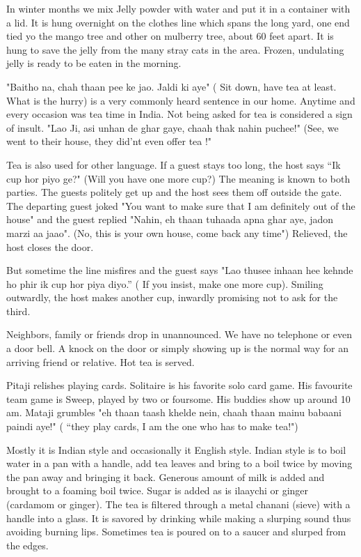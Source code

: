 In winter months we mix Jelly powder with water and put it in a container
with a lid. It is hung overnight on the clothes line which spans the long
yard, one end tied yo the mango tree and other on mulberry tree, about 60
feet apart. It is hung to save the jelly from the many stray cats in the
area. Frozen, undulating jelly is ready to be eaten in the morning. 

"Baitho na, chah thaan pee ke jao. Jaldi ki aye" ( Sit down, have tea at
least. What is the hurry) is a very commonly heard sentence in our home.
Anytime and every occasion was tea time in India. Not being asked for tea
is considered a sign of insult. "Lao Ji, asi unhan de ghar gaye, chaah
thak nahin puchee!" (See, we went to their house, they did'nt even offer
tea !" 

Tea is also used for other language. If a guest stays too long, the host
says “Ik cup hor piyo ge?" (Will you have one more cup?) The meaning is
known to both parties. The guests politely get up and the host sees them
off outside the gate. The departing guest joked "You want to make sure
that I am definitely out of the house" and the guest replied "Nahin, eh
thaan tuhaada apna ghar aye, jadon marzi aa jaao". (No, this is your own
house, come back any time") Relieved, the host closes the door. 

But sometime the line misfires and the guest says "Lao thusee inhaan hee
kehnde ho phir ik cup hor piya diyo.” ( If you insist, make one more cup).
Smiling outwardly, the host makes another cup, inwardly promising not to
ask for the third. 

Neighbors, family or friends drop in unannounced. We have no telephone or
even a door bell. A knock on the door or simply showing up is the normal
way for an arriving friend or relative. Hot tea is served. 

Pitaji relishes playing cards. Solitaire is his favorite solo card game.
His favourite team game is Sweep, played by two or foursome. His buddies
show up around 10 am. Mataji grumbles "eh thaan taash khelde nein, chaah
thaan mainu babaani paindi aye!" ( “they play cards, I am the one who has
to make tea!")

Mostly it is Indian style and occasionally it English style. Indian style
is to boil water in a pan with a handle, add tea leaves and bring to
a boil twice by moving the pan away and bringing it back. Generous amount
of milk is added and brought to a foaming boil twice. Sugar is added as is
ilaaychi or ginger (cardamom or ginger). The tea is filtered through
a metal chanani (sieve) with a handle into a glass. It is savored by
drinking while making a slurping sound thus avoiding burning lips.
Sometimes tea is poured on to a saucer and slurped from the edges. 


